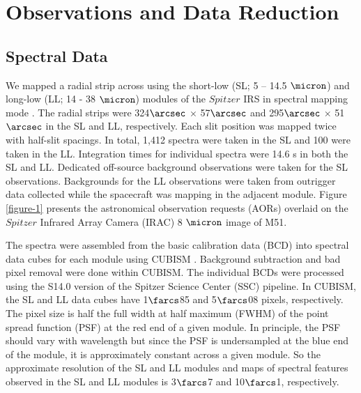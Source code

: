 \documentclass[12pt,preprint]{aastex}
\begin{document}
\section{Observations and Data Reduction}

\subsection{Spectral Data}

We mapped a radial strip across  using the short-low
(SL; 5 -- 14.5 $\micron$) and long-low (LL; 14 - 38 $\micron$) 
modules of the $Spitzer$ IRS in spectral
mapping mode \citep{hou04}.  The radial strips were 324$\arcsec$ $\times$
57$\arcsec$ and 295$\arcsec$ $\times$ 51$\arcsec$ in the SL and LL,
respectively.  Each slit position was mapped twice with half-slit spacings.  In
total, 1,412 spectra were taken in the SL and 100 were taken in the LL.  
Integration times for individual 
spectra were 14.6 s in both the SL and LL.  Dedicated off-source 
background observations were taken for the SL observations.  Backgrounds for the
LL observations were taken from outrigger data collected while the
spacecraft was mapping in the adjacent module.  Figure \ref{figure-1} 
presents the astronomical observation requests (AORs)
overlaid on the $Spitzer$ Infrared Array Camera (IRAC) 8 $\micron$ image of M51.

The spectra were assembled from the basic calibration data (BCD) into
spectral data cubes for each module using CUBISM \citep{ken03, smi04, smi07a}.
Background subtraction and bad pixel removal were done within CUBISM.
The individual BCDs were processed using the S14.0 version of
the Spitzer Science Center (SSC) pipeline.  In CUBISM, the SL and LL
data cubes have 1$\farcs$85 and 5$\farcs$08 pixels,
respectively.  The pixel size is half the full width at half 
maximum (FWHM) of the point spread function (PSF)
at the red end of a given module.  In principle, the PSF should 
vary with wavelength but since the PSF is
undersampled at the blue end of the module, it is approximately
constant across a given module.  So the approximate resolution of the
SL and LL modules and maps of spectral features observed 
in the SL and LL modules is 3$\farcs$7 and 10$\farcs$1, respectively.
\end{document}
